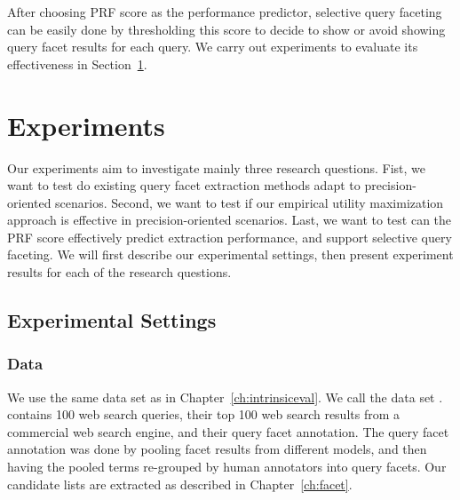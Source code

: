 After choosing PRF score as the performance predictor, selective query faceting can be easily done by thresholding this score to decide to show or avoid showing query facet results for each query. We carry out experiments to evaluate its effectiveness in Section~\ref{sec:precision-experiment}.


\section{Experiments}
\label{sec:precision-experiment}
Our experiments aim to investigate mainly three research questions. Fist, we want to test do existing query facet extraction methods adapt to precision-oriented scenarios. Second, we want to test if our empirical utility maximization approach is effective in precision-oriented scenarios. Last, we want to test can the PRF score effectively predict extraction performance, and support selective query faceting. We will first describe our experimental settings, then present experiment results for each of the research questions.

\subsection{Experimental Settings}
\subsubsection{Data}
We use the same data set as in Chapter~\ref{ch:intrinsiceval}. We call the data set \DQF. \DQF contains 100 web search queries, their top 100 web search results from a commercial web search engine, and their query facet annotation. The query facet annotation was done by pooling facet results from different models, and then having the pooled terms re-grouped by human annotators into query facets. Our candidate lists are extracted as described in Chapter~\ref{ch:facet}.

